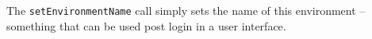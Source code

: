 The \verb+setEnvironmentName+ call simply sets the name of this environment -- something that can be used post login in
a user interface.
